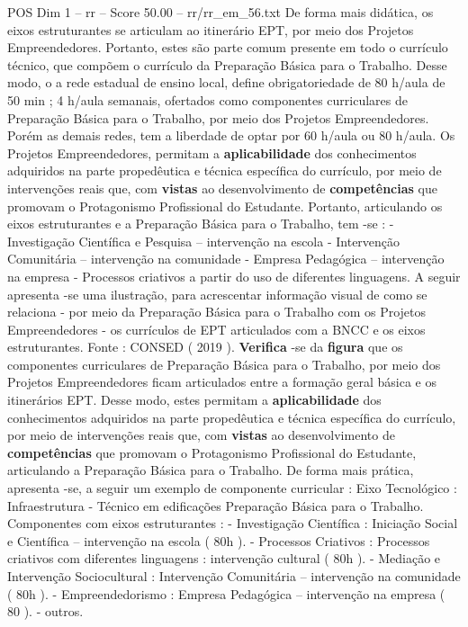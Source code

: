 \begin{textsample}{POS Dim 1 – rr – Score 50.00 – rr/rr\_em\_56.txt}
De forma mais didática, os eixos estruturantes se articulam ao itinerário EPT, por meio dos Projetos Empreendedores.
Portanto, estes são parte comum presente em todo o currículo técnico, que compõem o currículo da Preparação Básica para o Trabalho.
Desse modo, o a rede estadual de ensino local, define obrigatoriedade de 80 h/aula de 50 min ; 4 h/aula semanais, ofertados como componentes curriculares de Preparação Básica para o Trabalho, por meio dos Projetos Empreendedores.
Porém as demais redes, tem a liberdade de optar por 60 h/aula ou 80 h/aula.
Os Projetos Empreendedores, permitam a \textbf{aplicabilidade} dos conhecimentos adquiridos na parte propedêutica e técnica específica do currículo, por meio de intervenções reais que, com \textbf{vistas} ao desenvolvimento de \textbf{competências} que promovam o Protagonismo Profissional do Estudante.
Portanto, articulando os eixos estruturantes e a Preparação Básica para o Trabalho, tem -se : - Investigação Científica e Pesquisa – intervenção na escola - Intervenção Comunitária – intervenção na comunidade - Empresa Pedagógica – intervenção na empresa - Processos criativos a partir do uso de diferentes linguagens.
A seguir apresenta -se uma ilustração, para acrescentar informação visual de como se relaciona - por meio da Preparação Básica para o Trabalho com os Projetos Empreendedores - os currículos de EPT articulados com a BNCC e os eixos estruturantes.
Fonte : CONSED ( 2019 ). \textbf{Verifica} -se da \textbf{figura} que os componentes curriculares de Preparação Básica para o Trabalho, por meio dos Projetos Empreendedores ficam articulados entre a formação geral básica e os itinerários EPT.
Desse modo, estes permitam a \textbf{aplicabilidade} dos conhecimentos adquiridos na parte propedêutica e técnica específica do currículo, por meio de intervenções reais que, com \textbf{vistas} ao desenvolvimento de \textbf{competências} que promovam o Protagonismo Profissional do Estudante, articulando a Preparação Básica para o Trabalho.
De forma mais prática, apresenta -se, a seguir um exemplo de componente curricular : Eixo Tecnológico : Infraestrutura - Técnico em edificações Preparação Básica para o Trabalho.
Componentes com eixos estruturantes : - Investigação Científica : Iniciação Social e Científica – intervenção na escola ( 80h ). - Processos Criativos : Processos criativos com diferentes linguagens : intervenção cultural ( 80h ). - Mediação e Intervenção Sociocultural : Intervenção Comunitária – intervenção na comunidade ( 80h ). - Empreendedorismo : Empresa Pedagógica – intervenção na empresa ( 80 ). - outros.

\end{textsample}

